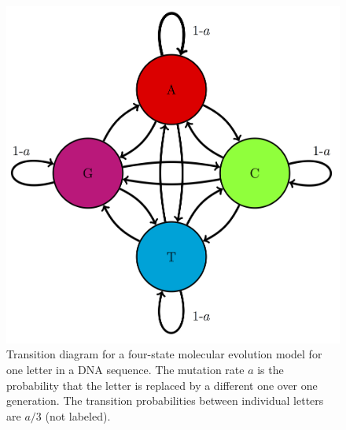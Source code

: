 \documentclass[
]{book}
\theoremstyle{definition}
\theoremstyle{definition}
\theoremstyle{definition}
\theoremstyle{remark}
\begin{document}
\begin{figure}
\centering
\includegraphics{ch13/JC_trans_diag.png}
\caption{Transition diagram for a four-state molecular evolution model for one letter in a DNA sequence. The mutation rate \(a\) is the probability that the letter is replaced by a different one over one generation. The transition probabilities between individual letters are \(a/3\) (not labeled).}
\end{figure}
\end{document}
